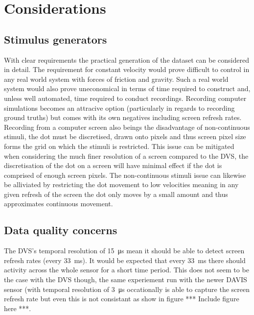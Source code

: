 \section{Considerations}
\subsection{Stimulus generators}
With clear requirements the practical generation of the dataset can be considered in detail.
The requirement for constant velocity would prove difficult to control in any real world system with forces of friction and gravity.
Such a real world system would also prove uneconomical in terms of time required to construct and, unless well automated, time required to conduct recordings. 
Recording computer simulations becomes an attracive option (particularly in regards to recording ground truths) but comes with its own negatives including screen refresh rates.
Recording from a computer screen also beings the disadvantage of non-continuous stimuli, the dot must be discretised, drawn onto pixels and thus screen pixel size forms the grid on which the stimuli is restricted. 
This issue can be mitigated when considering the much finer resolution of a screen compared to the DVS, the discretisation of the dot on a screen will have minimal effect if the dot is comprised of enough screen pixels.
The non-continuous stimuli issue can likewise be alliviated by restricting the dot movement to low velocities meaning in any given refresh of the screen the dot only moves by a small amount and thus approximates continuous movement. 


\subsection{Data quality concerns}

The DVS's temporal resolution of \SI{15}{\micro\second} mean it should be able to detect screen refresh rates (every \SI{33}{\milli\second}). 
It would be expected that every \SI{33}{\milli\second} there should activity across the whole sensor for a short time period. 
This does not seem to be the case with the DVS though, the same experiement run with the newer DAVIS sensor (with temporal resolution of \SI{3}{\micro\second} occationally is able to capture the screen refresh rate but even this is not consistant as show in figure *** Include figure here ***.

